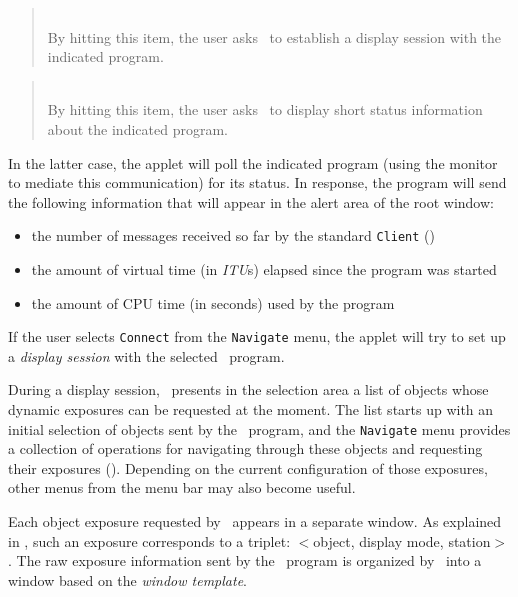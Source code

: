 \begin{quote}
\noindent{}\\ \hspace{0in}
By hitting this item, the user asks \dsd\ to establish a display session
with the indicated program.
\end{quote}

\begin{quote}
\noindent{}\\ \hspace{0in}
By hitting this item, the user asks \dsd\ to display short status
information about the indicated program.
\end{quote}\medskip

In the latter case, the applet will poll the indicated program
(using the monitor to mediate this communication) for its status.
In response, the program will send the following information that will appear
in the alert area of the root window:

\begin{itemize}
\item
the number of messages received so far by the standard {\tt Client}
()
\item
the amount of virtual time (in {\em ITU\/}s)
elapsed since the program was started
\item
the amount of CPU time (in seconds) used by the program
\end{itemize}

If the user selects {\tt Connect} from the {\tt Navigate} menu,
the applet will try to set up a {\em display session\/}
with the selected \smurph\ program.

During a display session,
\dsd\ presents in the selection area a list
of objects whose dynamic exposures can be requested at the moment.
The list starts up with an initial selection of objects
sent by the \smurph\ program, and the
{\tt Navigate} menu provides a collection of
operations for navigating through these objects and requesting their
exposures ().
Depending on the current configuration of those exposures,
other menus from the menu bar may also become useful.

Each object exposure requested by \dsd\ appears in a separate window.
As explained in , such an exposure corresponds to
a triplet: $<$object, display mode, station$>$.
The raw exposure information sent by the \smurph\ program is organized
by \dsd\ into a window based on the {\em window template}.

